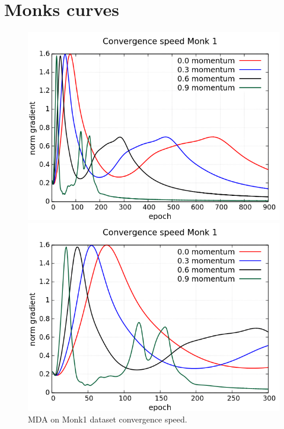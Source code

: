 \appendix
{}
\section{Monks curves}
\begin{figure}[H]
	\centering
	\begin{minipage}[t]{0.5\linewidth}
		\includegraphics[width=\linewidth]{data/MGD/Monk1/M/Monk1_MGD_CS_standard.png}
	\end{minipage}%
	\begin{minipage}[t]{0.5\linewidth}
		\includegraphics[width=\linewidth]{data/MGD/Monk1/M/Monk1_MGD_CS_zoom.png}
	\end{minipage}
	\caption{MDA on Monk1 dataset convergence speed.}
\end{figure}
